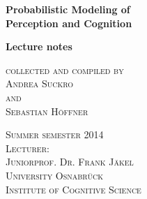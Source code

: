 ﻿\begin{center}


\vspace{2cm}

\Large
\textbf{Probabilistic Modeling of \\Perception and Cognition}\\

\vspace{1cm}

\normalsize
\textbf{Lecture notes}\\

\vspace{3cm}

\textsc{collected and compiled by\\
Andrea Suckro\\
and\\
Sebastian H\"offner\\}

\vspace{6cm}

\textsc{Summer semester 2014}\\
\vspace{1cm}
\textsc{Lecturer:\\
Juniorprof. Dr. Frank J\"akel}\\
\vspace{0.5cm}
\textsc{University Osnabr\"uck\\
Institute of Cognitive Science}\\


\end{center}